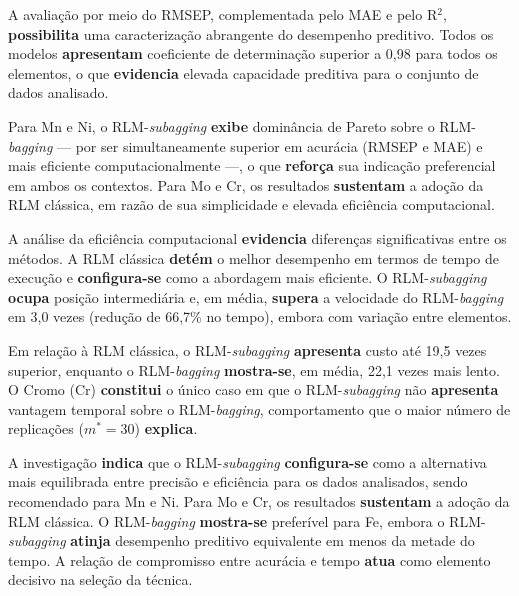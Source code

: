 
A avaliação por meio do RMSEP, complementada pelo \gls{MAE} e pelo 
R$^2$, \textbf{possibilita} uma caracterização abrangente do desempenho 
preditivo. Todos os modelos \textbf{apresentam} coeficiente de 
determinação superior a 0,98 para todos os elementos, o que 
\textbf{evidencia} elevada capacidade preditiva para o conjunto de dados 
analisado. %

Para Mn e Ni, o 
RLM-\textit{subagging} \textbf{exibe} dominância de Pareto sobre o 
RLM-\textit{bagging} --- por ser simultaneamente superior em acurácia 
(RMSEP e \gls{MAE}) e mais eficiente computacionalmente ---, o que 
\textbf{reforça} sua indicação preferencial em ambos os contextos. 
Para Mo e Cr, os resultados \textbf{sustentam} a adoção da RLM 
clássica, em razão de sua simplicidade e elevada eficiência 
computacional.


A análise da eficiência computacional \textbf{evidencia} diferenças 
significativas entre os métodos. A RLM clássica \textbf{detém} o melhor 
desempenho em termos de tempo de execução e \textbf{configura-se} como 
a abordagem mais eficiente. O RLM-\textit{subagging} \textbf{ocupa} 
posição intermediária e, em média, \textbf{supera} a velocidade do 
RLM-\textit{bagging} em 3,0 vezes (redução de 66,7\% no tempo), embora 
com variação entre elementos.

Em relação à RLM clássica, o 
RLM-\textit{subagging} \textbf{apresenta} custo até 19,5 vezes 
superior, enquanto o RLM-\textit{bagging} \textbf{mostra-se}, em média, 
22,1 vezes mais lento. O Cromo (Cr) \textbf{constitui} o único caso em 
que o RLM-\textit{subagging} não \textbf{apresenta} vantagem temporal 
sobre o RLM-\textit{bagging}, comportamento que o maior número de 
replicações ($m^* = 30$) \textbf{explica}.


A investigação \textbf{indica} que o RLM-\textit{subagging} 
\textbf{configura-se} como a alternativa mais equilibrada entre precisão 
e eficiência para os dados analisados, sendo recomendado para Mn e Ni. 
Para Mo e Cr, os 
resultados \textbf{sustentam} a adoção da RLM clássica. O 
RLM-\textit{bagging} \textbf{mostra-se} preferível para Fe, embora o 
RLM-\textit{subagging} \textbf{atinja} desempenho preditivo equivalente 
em menos da metade do tempo. A relação de compromisso entre acurácia e 
tempo \textbf{atua} como elemento decisivo na seleção da técnica.


